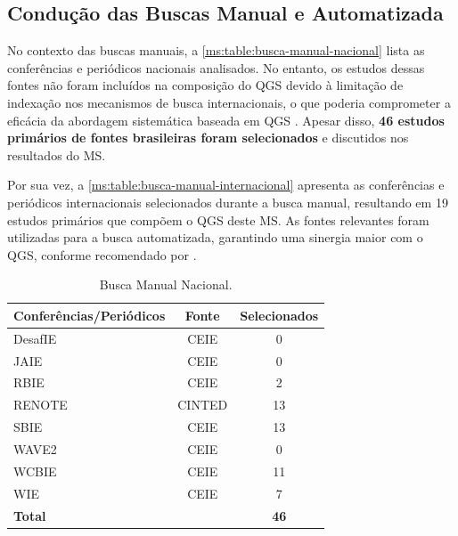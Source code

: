 \subsection{Condução das Buscas Manual e Automatizada}
\label{ms:conducao-busca-manual}

No contexto das buscas manuais, a \autoref{ms:table:busca-manual-nacional} lista as conferências e periódicos nacionais analisados. No entanto, os estudos dessas fontes não foram incluídos na composição do QGS devido à limitação de indexação nos mecanismos de busca internacionais, o que poderia comprometer a eficácia da abordagem sistemática baseada em QGS \cite{Zhang2011}. Apesar disso, \textbf{46 estudos primários de fontes brasileiras foram selecionados} e discutidos nos resultados do MS. 

Por sua vez, a \autoref{ms:table:busca-manual-internacional} apresenta as conferências e periódicos internacionais selecionados durante a busca manual, resultando em 19 estudos primários que compõem o QGS deste MS. As fontes relevantes foram utilizadas para a busca automatizada, garantindo uma sinergia maior com o QGS, conforme recomendado por .

\begin{table}[htb]
\centering
\caption{Busca Manual Nacional.}
\label{ms:table:busca-manual-nacional}
\begin{tabular}{l|c|c} \hline
\textbf{Conferências/Periódicos} & \textbf{Fonte} & \textbf{Selecionados} \\ \hline
DesafIE                          & CEIE           & 0                     \\
JAIE                             & CEIE           & 0                     \\
RBIE                             & CEIE           & 2                     \\
RENOTE                           & CINTED         & 13                    \\
SBIE                             & CEIE           & 13                    \\
WAVE2                            & CEIE           & 0                     \\
WCBIE                            & CEIE           & 11                    \\
WIE                              & CEIE           & 7                     \\ \hline
\multicolumn{2}{l}{\textbf{Total}}                & \textbf{46}           \\ \hline
\end{tabular}
\end{table}

